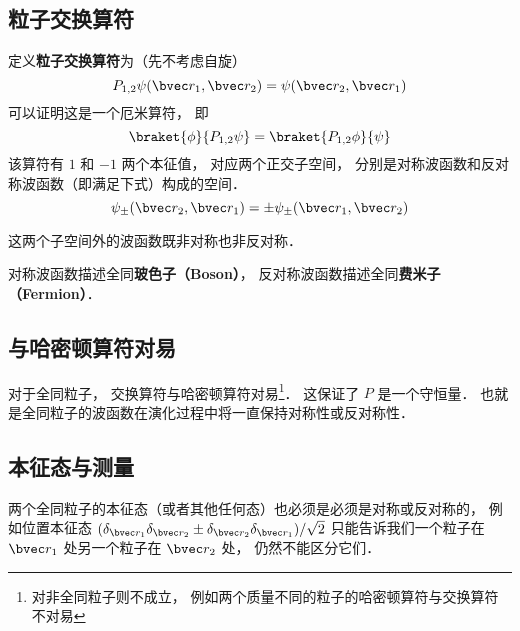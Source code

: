 
\subsection{粒子交换算符}

定义\textbf{粒子交换算符}为（先不考虑自旋）
\begin{equation}
P_{1,2}\psi(\bvec r_1, \bvec r_2) = \psi(\bvec r_2, \bvec r_1)
\end{equation}
可以证明这是一个厄米算符， 即
\begin{equation}
\braket{\phi}{P_{1,2}\psi} = \braket{P_{1,2}\phi}{\psi}
\end{equation}
该算符有 $1$ 和 $-1$ 两个本征值， 对应两个正交子空间， 分别是对称波函数和反对称波函数（即满足下式）构成的空间．
\begin{equation}
\psi_\pm(\bvec r_2, \bvec r_1) = \pm\psi_\pm(\bvec r_1, \bvec r_2)
\end{equation}

这两个子空间外的波函数既非对称也非反对称．

对称波函数描述全同\textbf{玻色子（Boson）}， 反对称波函数描述全同\textbf{费米子（Fermion）}．

\subsection{与哈密顿算符对易}

对于全同粒子， 交换算符与哈密顿算符对易\footnote{对非全同粒子则不成立， 例如两个质量不同的粒子的哈密顿算符与交换算符不对易}． 这保证了 $P$ 是一个守恒量． 也就是全同粒子的波函数在演化过程中将一直保持对称性或反对称性．

\subsection{本征态与测量}
两个全同粒子的本征态（或者其他任何态）也必须是必须是对称或反对称的， 例如位置本征态 $(\delta_{\bvec r_1} \delta_{\bvec r_2}\pm \delta_{\bvec r_2} \delta_{\bvec r_1})/\sqrt 2$ 只能告诉我们一个粒子在 $\bvec r_1$ 处另一个粒子在 $\bvec r_2$ 处， 仍然不能区分它们．

